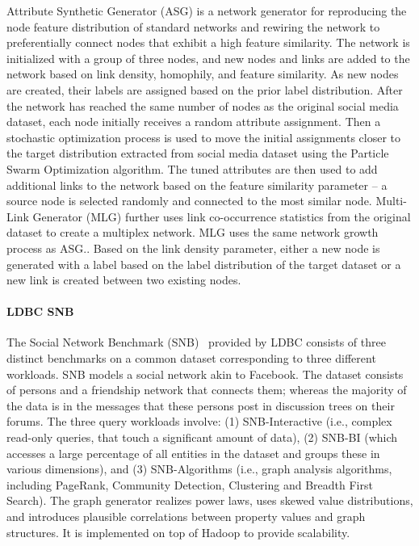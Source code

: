 Attribute Synthetic Generator (ASG) is a network generator for reproducing the
node feature distribution of standard networks and rewiring the network to
preferentially connect nodes that exhibit a high feature similarity. The network
is initialized with a group of three nodes, and new nodes and links are added to
the network based on link density, homophily, and feature similarity. As new
nodes are created, their labels are assigned based on the prior label
distribution. After the network has reached the same number of nodes as the
original social media dataset, each node initially receives a random attribute
assignment. Then a stochastic optimization process is used to move the initial
assignments closer to the target distribution extracted from social media
dataset using the Particle Swarm Optimization algorithm. The tuned attributes
are then used to add additional links to the network based on the feature
similarity parameter -- a source node is selected randomly and connected to the
most similar node. Multi-Link Generator (MLG) further  uses link co-occurrence statistics from the
original dataset to create a multiplex network. MLG uses the same network growth
process as ASG.. Based on the link density parameter, either a new node is
generated with a label based on the label distribution of the target dataset or
a new link is created between two existing nodes.


\paragraph{LDBC SNB} The Social Network Benchmark
(SNB)~\cite{Erling:2015:LSN:2723372.2742786} provided by LDBC consists of three
distinct benchmarks on a common dataset corresponding to three different
workloads. SNB models a social network akin to Facebook. The dataset consists of
persons and a friendship network that connects them; whereas the majority of the
data is in the messages that these persons post in discussion trees on their
forums. The three query workloads involve: (1) SNB-Interactive (i.e., complex
read-only queries, that touch a significant amount of data), (2) SNB-BI (which
accesses a large percentage of all entities in the dataset and groups these in
various dimensions), and (3) SNB-Algorithms (i.e., graph analysis algorithms,
including PageRank, Community Detection, Clustering and Breadth First Search).
The graph generator realizes power laws, uses skewed value distributions, and
introduces plausible correlations between property values and graph structures.
It is implemented on top of Hadoop to provide scalability.

